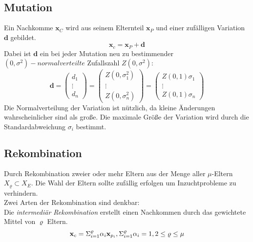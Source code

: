 \subsection[Mutation]{Mutation}
Ein Nachkomme $\mathbf{x}_C$ wird aus seinem Elternteil $\mathbf{x}_P$ und einer zufälligen Variation $\mathbf{d}$ gebildet.
\begin{equation} \label{eq:Mutation_Child}
	\mathbf{x}_c = \mathbf{x}_P + \mathbf{d}
\end{equation}
Dabei ist $\mathbf{d}$ ein bei jeder Mutation neu zu bestimmender $(0,\sigma^2)-normalverteilte$ Zufallszahl $Z(0,\sigma^2)$:
\begin{equation}\label{eq:wavenumber_trilateration_model}
\mathbf{d}=
\left(
	\begin{array}{c}
		d_1 \\
		\vdots\\
		d_n 
	\end{array}
\right)
=
\left(
	\begin{array}{c}
		Z(0,\sigma_1^2) \\
		\vdots\\
		Z(0,\sigma_n^2) 
	\end{array}
\right)
=
\left(
	\begin{array}{c}
		Z(0,1) \sigma_1 \\
		\vdots\\
		Z(0,1) \sigma_n 
	\end{array}
\right)
\end{equation}
%
Die Normalverteilung der Variation ist nützlich, da kleine Änderungen wahrscheinlicher sind als große. Die maximale Größe der Variation wird durch die Standardabweichung $\sigma_i$ bestimmt.
%
\subsection[Rekombination]{Rekombination}
Durch Rekombination zweier oder mehr Eltern aus der Menge aller $\mu$-Eltern $X_{\varrho} \subset X_E$. Die Wahl der Eltern sollte zufällig erfolgen um Inzuchtprobleme zu verhindern.\\
Zwei Arten der Rekombination sind denkbar:\\

Die \textit{intermediär Rekombination} erstellt einen Nachkommen durch das gewichtete Mittel von $\varrho$ Eltern.
%
\begin{equation}
\mathbf{x}_c = \Sigma^\varrho_{i=1} \alpha_i\mathbf{x}_{p_i},\\ \Sigma^\varrho_{i=1} \alpha_i = 1,\\ 2\leq\varrho\leq\mu
\end{equation} 
%

